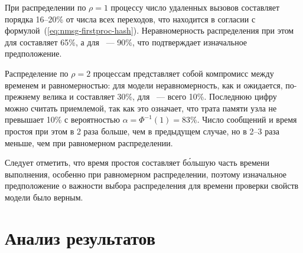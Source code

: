 При распределении по $\rho = 1$ процессу число удаленных вызовов составляет порядка
16--20\% от числа всех переходов, что находится в согласии с
формулой~(\ref{eq:nmsg-firstproc-hash}). Неравномерность распределения при этом для
 составляет 65\%, а для ~--- 90\%, что подтверждает изначальное
предположение.

Распределение по $\rho = 2$ процессам представляет собой компромисс между временем и
равномерностью: для модели  неравномерность, как и ожидается, по-прежнему
велика и составляет 30\%, для ~--- всего 10\%. Последнюю цифру можно
считать приемлемой, так как это означает, что трата памяти узла не превышает 10\% с
вероятностью $\alpha = \Phi^{-1}(1) = 83\%$. Число сообщений и время простоя при этом в 2
раза больше, чем в предыдущем случае, но в 2--3 раза меньше, чем при равномерном
распределении.

Следует отметить, что время простоя составляет б\'{о}льшую часть времени выполнения,
особенно при равномерном распределении, поэтому изначальное предположение о важности
выбора распределения для времени проверки свойств модели было верным.

\section{Анализ результатов}
\label{sec:experiment-analysis}


